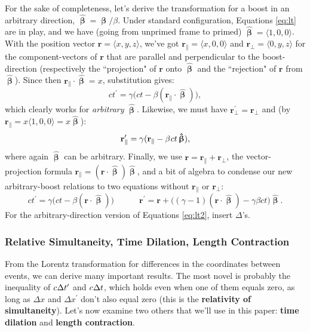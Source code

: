 \documentclass[12pt]{article}
\renewcommand{\vv}[1]{\mathbf{#1}}
\newcommand{\vvbeta}{\bm{\upbeta}}
\newcommand{\hatbeta}{\bm{\hat{\upbeta}}}
\begin{document}
For the sake of completeness, let's derive the transformation for a boost in an arbitrary direction, $\hatbeta = \vvbeta / \beta$. Under standard configuration, Equations \ref{eq:lt} are in play, and we have (going from unprimed frame to primed) ${ \hatbeta = \langle 1, 0, 0 \rangle }$. With the position vector $\vv r = \langle x, y, z \rangle$, we've got ${ \vv r _\parallel = \langle x, 0, 0 \rangle }$ and ${\vv r _\perp = \langle 0, y, z \rangle}$ for the component-vectors of $\vv r$ that are parallel and perpendicular to the boost-direction (respectively the ``projection" of $\vv r$ onto $\hatbeta$ and the ``rejection" of $\vv r$ from $\hatbeta$). Since then $\vv r _\parallel \cdot \hatbeta = x$, substitution gives:
\begin{equation*}
c t^{\prime} = \gamma \big( c t - \beta (\vv r _\parallel \cdot \hatbeta ) \big),
\end{equation*}
which clearly works for \emph{arbitrary} $\hatbeta$. Likewise, we must have $\vv r^{\prime} _\perp = \vv r _\perp$ and (by $\vv r _\parallel = x \langle 1, 0, 0 \rangle = x \hatbeta$):
\begin{equation*}
\vv r^{\prime} _\parallel = \gamma ( \vv r _\parallel - \beta \mkern1mu c t \, \hatbeta ),
\end{equation*}
where again $\hatbeta$ can be arbitrary. Finally, we use $\vv r = \vv r _\parallel + \vv r _\perp$, the vector-projection formula $\vv r _\parallel = (\vv r \cdot \hatbeta) \hatbeta$, and a bit of algebra to condense our new arbitrary-boost relations to two equations without $\vv r _\parallel$ or $\vv r _\perp$:
\begin{equation}\label{eq:lt3}
c t^{\prime} = \gamma \big( c t - \beta ( \vv r \cdot \hatbeta ) \big) \qquad \quad
\vv r^{\prime} = \vv r + \big( (\gamma - 1)(\vv r \cdot \hatbeta) - \gamma \beta c t \big) \hatbeta .
\end{equation}
For the arbitrary-direction version of Equations \ref{eq:lt2}, insert $\Delta$'s.


\subsubsection{Relative Simultaneity, Time Dilation, Length Contraction}\label{sssec:td}

From the Lorentz transformation for differences in the coordinates between events, we can derive many important results. The most novel is probably the inequality of $c \mkern.5mu \Delta t^{\prime}$ and $c \mkern.5mu \Delta t$, which holds even when one of them equals zero, as long as $\Delta x$ and $\Delta x^\prime$ don't also equal zero (this is the \textbf{relativity of simultaneity}). Let's now examine two others that we'll use in this paper: \textbf{time dilation} and \textbf{length contraction}.
\end{document}
